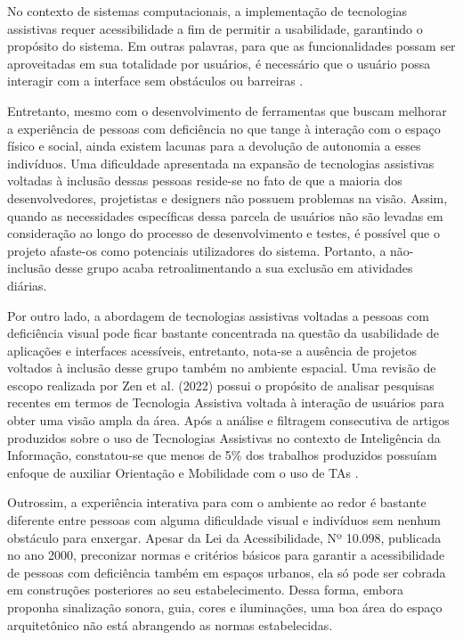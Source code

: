 No contexto de sistemas computacionais, a implementação de tecnologias assistivas requer acessibilidade a fim de permitir a usabilidade, garantindo o propósito do sistema. Em outras palavras, para que as funcionalidades possam ser aproveitadas em sua totalidade por usuários, é necessário que o usuário possa interagir com a interface sem obstáculos ou barreiras \cite{BarbosaSilva2010}. 

Entretanto, mesmo com o desenvolvimento de ferramentas que buscam melhorar a experiência de pessoas com deficiência no que tange à interação com o espaço físico e social, ainda existem lacunas para a devolução de autonomia a esses indivíduos. Uma dificuldade apresentada na expansão de tecnologias assistivas voltadas à inclusão dessas pessoas reside-se no fato de que a maioria dos desenvolvedores, projetistas e designers não possuem problemas na visão. Assim, quando as necessidades específicas dessa parcela de usuários não são levadas em consideração ao longo do processo de desenvolvimento e testes, é possível que o projeto afaste-os como potenciais utilizadores do sistema. Portanto, a não-inclusão desse grupo acaba retroalimentando a sua exclusão em atividades diárias. 

Por outro lado, a abordagem de tecnologias assistivas voltadas a pessoas com deficiência visual pode ficar bastante concentrada na questão da usabilidade de aplicações e interfaces acessíveis, entretanto, nota-se a ausência de projetos voltados à inclusão desse grupo também no ambiente espacial. Uma revisão de escopo realizada por Zen et al. (2022) possui o propósito de analisar pesquisas recentes em termos de Tecnologia Assistiva voltada à interação de usuários para obter uma visão ampla da área. Após a análise e filtragem consecutiva de artigos produzidos sobre o uso de Tecnologias Assistivas no contexto de Inteligência da Informação, constatou-se que menos de 5\% dos trabalhos produzidos possuíam enfoque de auxiliar Orientação e Mobilidade com o uso de TAs  \cite{TecnologiaAssistivaDeficienciaVisual}.

Outrossim, a experiência interativa para com o ambiente ao redor é bastante diferente entre pessoas com alguma dificuldade visual e indivíduos sem nenhum obstáculo para enxergar. Apesar da Lei da Acessibilidade, Nº 10.098, publicada no ano 2000, preconizar normas e critérios básicos para garantir a acessibilidade de pessoas com deficiência também em espaços urbanos, ela só pode ser cobrada em construções posteriores ao seu estabelecimento. Dessa forma, embora proponha sinalização sonora, guia, cores e iluminações, uma boa área do espaço arquitetônico não está abrangendo as normas estabelecidas.

